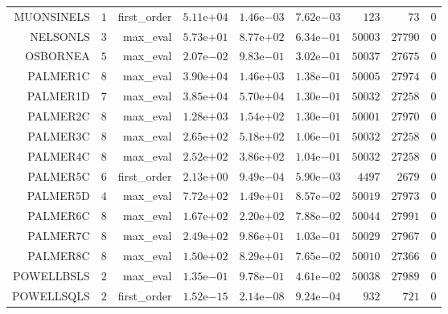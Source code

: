 \begin{longtable}{rrrrrrrrr}
MUONSINELS & \(     1\) & first\_order & \( 5.11\)e\(+04\) & \( 1.46\)e\(-03\) & \( 7.62\)e\(-03\) & \(   123\) & \(    73\) & \(     0\) \\
NELSONLS & \(     3\) & max\_eval & \( 5.73\)e\(+01\) & \( 8.77\)e\(+02\) & \( 6.34\)e\(-01\) & \( 50003\) & \( 27790\) & \(     0\) \\
OSBORNEA & \(     5\) & max\_eval & \( 2.07\)e\(-02\) & \( 9.83\)e\(-01\) & \( 3.02\)e\(-01\) & \( 50037\) & \( 27675\) & \(     0\) \\
PALMER1C & \(     8\) & max\_eval & \( 3.90\)e\(+04\) & \( 1.46\)e\(+03\) & \( 1.38\)e\(-01\) & \( 50005\) & \( 27974\) & \(     0\) \\
PALMER1D & \(     7\) & max\_eval & \( 3.85\)e\(+04\) & \( 5.70\)e\(+04\) & \( 1.30\)e\(-01\) & \( 50032\) & \( 27258\) & \(     0\) \\
PALMER2C & \(     8\) & max\_eval & \( 1.28\)e\(+03\) & \( 1.54\)e\(+02\) & \( 1.30\)e\(-01\) & \( 50001\) & \( 27970\) & \(     0\) \\
PALMER3C & \(     8\) & max\_eval & \( 2.65\)e\(+02\) & \( 5.18\)e\(+02\) & \( 1.06\)e\(-01\) & \( 50032\) & \( 27258\) & \(     0\) \\
PALMER4C & \(     8\) & max\_eval & \( 2.52\)e\(+02\) & \( 3.86\)e\(+02\) & \( 1.04\)e\(-01\) & \( 50032\) & \( 27258\) & \(     0\) \\
PALMER5C & \(     6\) & first\_order & \( 2.13\)e\(+00\) & \( 9.49\)e\(-04\) & \( 5.90\)e\(-03\) & \(  4497\) & \(  2679\) & \(     0\) \\
PALMER5D & \(     4\) & max\_eval & \( 7.72\)e\(+02\) & \( 1.49\)e\(+01\) & \( 8.57\)e\(-02\) & \( 50019\) & \( 27973\) & \(     0\) \\
PALMER6C & \(     8\) & max\_eval & \( 1.67\)e\(+02\) & \( 2.20\)e\(+02\) & \( 7.88\)e\(-02\) & \( 50044\) & \( 27991\) & \(     0\) \\
PALMER7C & \(     8\) & max\_eval & \( 2.49\)e\(+02\) & \( 9.86\)e\(+01\) & \( 1.03\)e\(-01\) & \( 50029\) & \( 27967\) & \(     0\) \\
PALMER8C & \(     8\) & max\_eval & \( 1.50\)e\(+02\) & \( 8.29\)e\(+01\) & \( 7.65\)e\(-02\) & \( 50010\) & \( 27366\) & \(     0\) \\
POWELLBSLS & \(     2\) & max\_eval & \( 1.35\)e\(-01\) & \( 9.78\)e\(-01\) & \( 4.61\)e\(-02\) & \( 50038\) & \( 27989\) & \(     0\) \\
POWELLSQLS & \(     2\) & first\_order & \( 1.52\)e\(-15\) & \( 2.14\)e\(-08\) & \( 9.24\)e\(-04\) & \(   932\) & \(   721\) & \(     0\) \\

\end{longtable}
